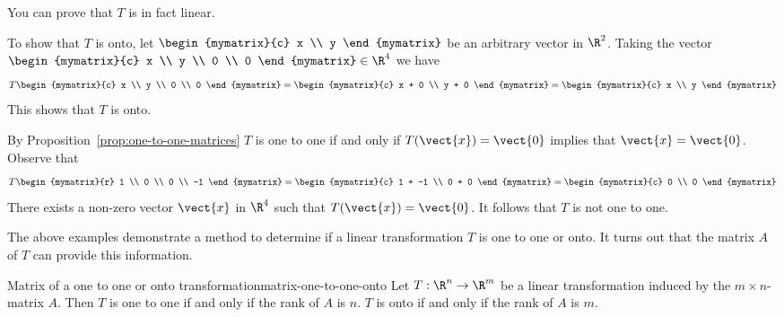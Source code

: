 \begin{solution} 
You can prove that $T$ is in fact linear. 

To show that $T$ is onto, let $\begin{mymatrix}{c} 
x \\
y
\end{mymatrix}$ be an arbitrary vector in $\R^2$. Taking the vector $\begin{mymatrix}{c}
x \\
y \\
0 \\
0 
\end{mymatrix} \in \R^4$ we have 
\[
T \begin{mymatrix}{c}
x \\
y \\
0 \\
0
\end{mymatrix} = 
\begin{mymatrix}{c}
x + 0 \\
y + 0 
\end{mymatrix}
= \begin{mymatrix}{c}
x \\
y 
\end{mymatrix}
\]
This shows that $T$ is onto. 

By Proposition~\ref{prop:one-to-one-matrices} $T$ is one to one if and only if $T(\vect{x}) = \vect{0}$ implies that $\vect{x} = \vect{0}$. Observe that 
\[
T \begin{mymatrix}{r}
1 \\
0 \\
0 \\
-1
\end{mymatrix} = 
\begin{mymatrix}{c}
1 + -1 \\
0 + 0 
\end{mymatrix}
= \begin{mymatrix}{c}
0 \\
0 
\end{mymatrix}
\]
There exists a non-zero vector $\vect{x}$ in $\R^4$ such that $T(\vect{x}) = \vect{0}$. It follows that $T$ is not one to one.
\end{solution}

The above examples demonstrate a method to determine if a linear transformation $T$ is one to one or onto. It turns out that the matrix $A$ of $T$ can provide this information.

\begin{theorem}{Matrix of a one to one or onto transformation}{matrix-one-to-one-onto}
Let $T: \R^n \to \R^m$ be a linear transformation induced by the $m \times n$-matrix $A$. Then $T$ is one to one if and only if the rank of $A$ is $n$. $T$ is onto if and only if the rank of $A$ is $m$. 
\end{theorem}

